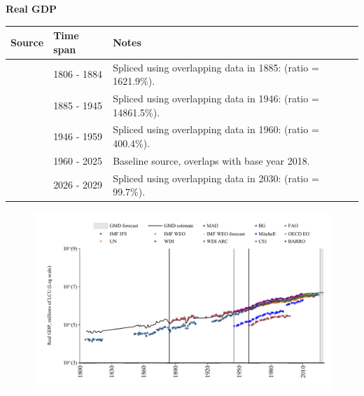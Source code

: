 \documentclass[12pt,a4paper,landscape]{article}
\begin{document}
\begin{adjustbox}{max totalsize={\paperwidth}{\paperheight},center}
\begin{minipage}[t][\textheight][t]{\textwidth}
\vspace*{0.5cm}
{}
\begin{center}
{\Large\bfseries Real GDP}
\end{center}
\vspace{0.5cm}
\begin{table}[H]
\centering
\small
\begin{tabular}{|l|l|l|}
\hline
\textbf{Source} & \textbf{Time span} & \textbf{Notes} \\
\hline
\rowcolor{white}\cite{MAD}& 1806 - 1884 &Spliced using overlapping data in 1885: (ratio = 1621.9\%). \\
\rowcolor{lightgray}\cite{BG}& 1885 - 1945 &Spliced using overlapping data in 1946: (ratio = 14861.5\%). \\
\rowcolor{white}\cite{Mitchell}& 1946 - 1959 &Spliced using overlapping data in 1960: (ratio = 400.4\%). \\
\rowcolor{lightgray}\cite{OECD_EO}& 1960 - 2025 &Baseline source, overlaps with base year 2018. \\
\rowcolor{white}\cite{IMF_WEO_forecast}& 2026 - 2029 &Spliced using overlapping data in 2030: (ratio = 99.7\%). \\
\hline
\end{tabular}
\end{table}
\begin{figure}[H]
\centering
\includegraphics[width=\textwidth,height=0.6\textheight,keepaspectratio]{graphs/ZAF_rGDP.pdf}
\end{figure}
\end{minipage}
\end{adjustbox}
\end{document}

